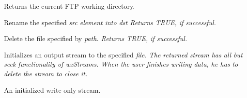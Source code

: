 

Returns the current FTP working directory.




Rename the specified \it{src} element into \it{dst}
Returns TRUE, if successful.




Delete the file specified by \it{path}.
Returns TRUE, if successful.




Initializes an output stream to the specified \it{file}. The returned
stream has all but seek functionality of wxStreams. When the user finishes
writing data, he has to delete the stream to close it.


An initialized write-only stream.
